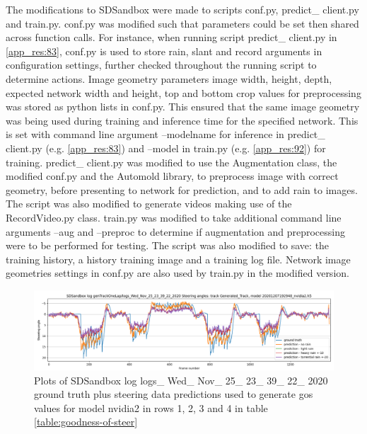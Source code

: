 The modifications to SDSandbox were made to scripts conf.py, predict\_ client.py and train.py. conf.py was modified such that parameters could be set then shared across function calls. For instance, when running script predict\_ client.py in \ref{app_res:83}, conf.py is used to store rain, slant and record arguments in configuration settings, further checked throughout the running script to determine actions. Image geometry parameters image width, height, depth, expected network width and height, top and bottom crop values for preprocessing was stored as python lists in conf.py. This ensured that the same image geometry was being used during training and inference time for the specified network. This is set with command line argument --modelname for inference in predict\_ client.py (e.g. \ref{app_res:83}) and --model in train.py (e.g. \ref{app_res:92}) for training.  
predict\_ client.py was modified to use the Augmentation class, the modified conf.py and the Automold library, to preprocess image with correct geometry, before presenting to network for prediction, and to add rain to images. The script was also modified to generate videos making use of the RecordVideo.py class.  
train.py was modified to take additional command line arguments --aug and --preproc to determine if augmentation and preprocessing were to be performed for testing. The script was also modified to save: the training history, a history training image and a training log file. Network image geometries settings in conf.py are also used by train.py in the modified version.



\begin{figure}[ht]
 \centering 
 \includegraphics[width=\textwidth]{Figures/sa_Generated_Track_20201207192948_nvidia2.h5.png}
 \caption{Plots of SDSandbox log logs\_ Wed\_ Nov\_ 25\_ 23\_ 39\_ 22\_ 2020 ground truth plus steering data predictions used to generate gos values for model nvidia2 in rows 1, 2, 3 and 4 in table \ref{table:goodness-of-steer}}
 \label{fig:sa_Generated_Track_20201207192948_nvidia2.h5} 
\end{figure}

